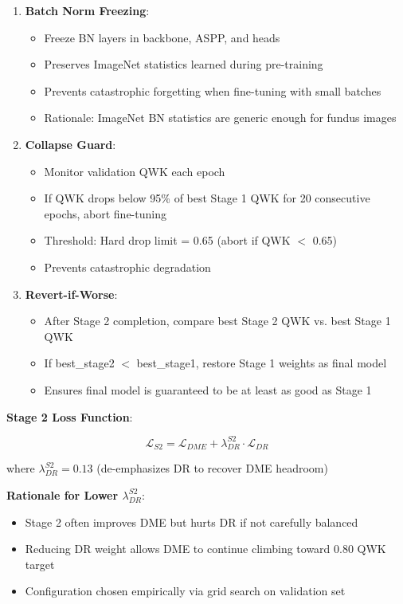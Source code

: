 \begin{enumerate}
    \item \textbf{Batch Norm Freezing}:
    \begin{itemize}
        \item Freeze BN layers in backbone, ASPP, and heads
        \item Preserves ImageNet statistics learned during pre-training
        \item Prevents catastrophic forgetting when fine-tuning with small batches
        \item Rationale: ImageNet BN statistics are generic enough for fundus images
    \end{itemize}
    
    \item \textbf{Collapse Guard}:
    \begin{itemize}
        \item Monitor validation QWK each epoch
        \item If QWK drops below 95\% of best Stage 1 QWK for 20 consecutive epochs, abort fine-tuning
        \item Threshold: Hard drop limit = 0.65 (abort if QWK $<$ 0.65)
        \item Prevents catastrophic degradation
    \end{itemize}
    
    \item \textbf{Revert-if-Worse}:
    \begin{itemize}
        \item After Stage 2 completion, compare best Stage 2 QWK vs. best Stage 1 QWK
        \item If best\_stage2 $<$ best\_stage1, restore Stage 1 weights as final model
        \item Ensures final model is guaranteed to be at least as good as Stage 1
    \end{itemize}
\end{enumerate}

\textbf{Stage 2 Loss Function}:

\begin{equation}
\mathcal{L}_{S2} = \mathcal{L}_{DME} + \lambda_{DR}^{S2} \cdot \mathcal{L}_{DR}
\end{equation}

where $\lambda_{DR}^{S2}=0.13$ (de-emphasizes DR to recover DME headroom)

\textbf{Rationale for Lower $\lambda_{DR}^{S2}$}:
\begin{itemize}
    \item Stage 2 often improves DME but hurts DR if not carefully balanced
    \item Reducing DR weight allows DME to continue climbing toward 0.80 QWK target
    \item Configuration chosen empirically via grid search on validation set
\end{itemize}


